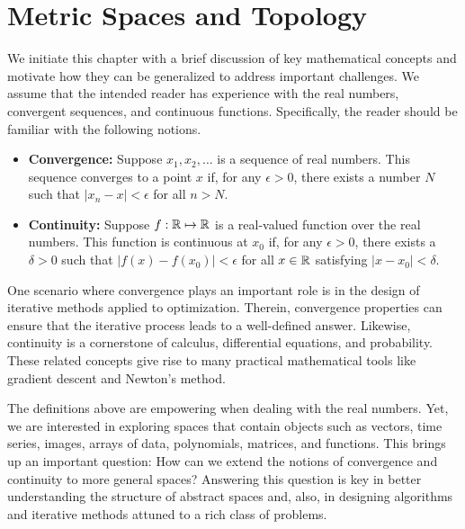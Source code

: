 \chapter{Metric Spaces and Topology}

We initiate this chapter with a brief discussion of key mathematical concepts and motivate how they can be generalized to address important challenges.
We assume that the intended reader has experience with the real numbers, convergent sequences, and continuous functions.
Specifically, the reader should be familiar with the following notions.
\begin{itemize}
\item \textbf{Convergence:}
Suppose $x_1, x_2, \ldots$ is a sequence of real numbers.
This sequence converges to a point $x$ if, for any $\epsilon > 0$, there exists a number $N$ such that $| x_n - x | < \epsilon$ for all $n > N$.
\item \textbf{Continuity:}
Suppose $f : \mathbb{R} \mapsto \mathbb{R}$ is a real-valued function over the real numbers.
This function is continuous at $x_0$ if, for any $\epsilon > 0$, there exists a $\delta > 0$ such that $| f(x) - f(x_0) | < \epsilon$ for all $x \in \mathbb{R}$ satisfying $|x - x_0| < \delta$.
\end{itemize}
One scenario where convergence plays an important role is in the design of iterative methods applied to optimization.
Therein, convergence properties can ensure that the iterative process leads to a well-defined answer.
Likewise, continuity is a cornerstone of calculus, differential equations, and probability.
These related concepts give rise to many practical mathematical tools like gradient descent and Newton's method.

The definitions above are empowering when dealing with the real numbers.
Yet, we are interested in exploring spaces that contain objects such as vectors, time series, images, arrays of data, polynomials, matrices, and functions.
This brings up an important question: How can we extend the notions of convergence and continuity to more general spaces?
Answering this question is key in better understanding the structure of abstract spaces and, also, in designing algorithms and iterative methods attuned to a rich class of problems.

